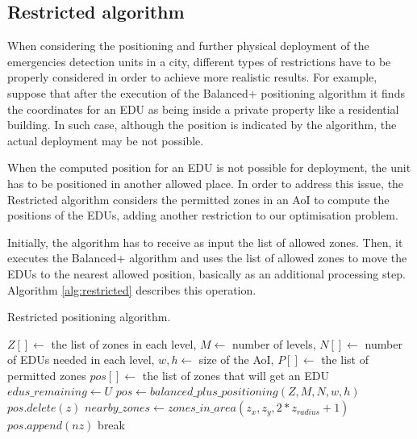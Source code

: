 \begin{refsection}
\subsection {Restricted algorithm}

When considering the positioning and further physical deployment of the emergencies detection units in a city, different types of restrictions have to be properly considered in order to achieve more realistic results. For example, suppose that after the execution of the Balanced+ positioning algorithm it finds the coordinates for an EDU as being inside a private property like a residential building. In such case, although the position is indicated by the algorithm, the actual deployment may be not possible.

When the computed position for an EDU is not possible for deployment, the unit has to be positioned in another allowed place. In order to address this issue, the Restricted algorithm considers the permitted zones in an AoI to compute the positions of the EDUs, adding another restriction to our optimisation problem. 

Initially, the algorithm has to receive as input the list of allowed zones. Then, it executes the Balanced+ algorithm and uses the list of allowed zones to move the EDUs to the nearest allowed position, basically as an additional processing step. Algorithm \ref{alg:restricted} describes this operation. 

\begin{algorithm}[ht]
    \caption{Restricted positioning algorithm.}
    \label{alg:restricted}
    \begin{algorithmic}
        \REQUIRE $Z[] \gets$ the list of zones in each level, $M \gets$ number of levels, $N[] \gets$ number of EDUs needed in each level, $w, h \gets$ size of the AoI, $P[] \gets$ the list of permitted zones
        \ENSURE $pos[] \gets$ the list of zones that will get an EDU
        \STATE $edus\_remaining \gets U$
            \STATE $pos \gets balanced\_plus\_positioning(Z, M, N, w, h)$
                    \STATE $pos.delete(z)$
                    \STATE $nearby\_zones \gets zones\_in\_area(z_x, z_y, 2 * z_{radius} + 1)$
                            \STATE $pos.append(nz)$
                            \STATE break
                        \ENDIF
                    \ENDFOR
                \ENDIF
            \ENDFOR
        \ENDWHILE
    \end{algorithmic}
\end{algorithm}


\end{refsection}
